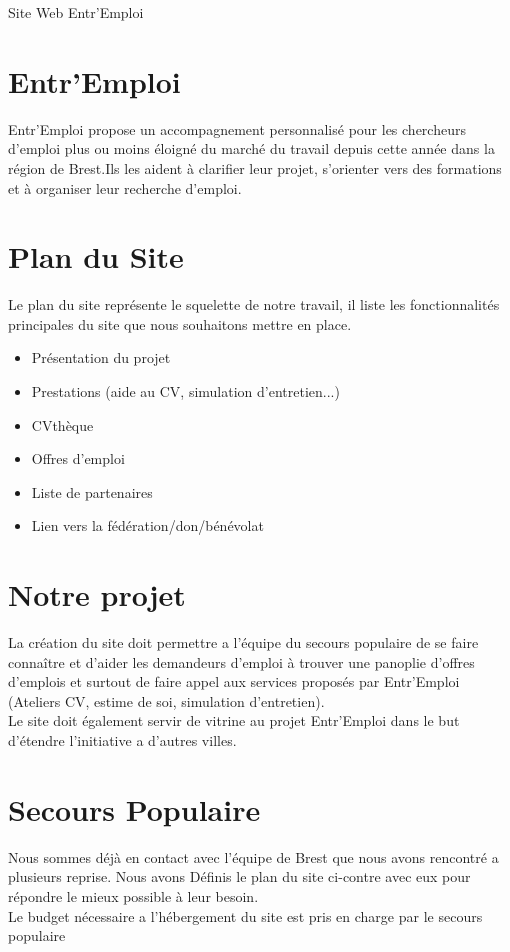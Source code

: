 \documentclass[a4paper, 12pt]{article}
\begin{document}
\begin{center}\Huge Site Web Entr'Emploi\end{center}
\vskip2cm

\begin{multicols}{2}
\section*{Entr'Emploi}
Entr'Emploi propose un accompagnement personnalisé pour les chercheurs d'emploi plus ou moins éloigné du marché du travail depuis cette année dans la région de Brest.Ils les aident à clarifier leur projet, s'orienter vers des formations et à organiser leur recherche d'emploi.
\vskip2cm
\section*{Plan du Site}
Le plan du site représente le squelette de notre travail, il liste les fonctionnalités principales du site que nous souhaitons mettre en place.
\begin{itemize}
    \item Présentation du projet
    \item Prestations (aide au CV, simulation d'entretien...)
    \item CVthèque
    \item Offres d'emploi
    \item Liste de partenaires
    \item Lien vers la fédération/don/bénévolat
\end{itemize}

\section*{Notre projet}
La création du site doit permettre a l'équipe du secours populaire de se faire connaître et d'aider les demandeurs d'emploi à trouver une panoplie d'offres d'emplois et surtout de faire
appel aux services proposés par Entr'Emploi (Ateliers CV, estime de soi, simulation d'entretien).\\
Le site doit également servir de vitrine au projet Entr'Emploi dans le but d'étendre l’initiative a d'autres villes.
\vskip2cm
\section*{Secours Populaire}
Nous sommes déjà en contact avec l'équipe de Brest que nous avons rencontré a plusieurs reprise. Nous avons Définis le plan du site ci-contre avec eux pour répondre le mieux possible à leur besoin.\\
Le budget nécessaire a l’hébergement du site est pris en charge par le secours populaire
\end{multicols}
\end{document}
